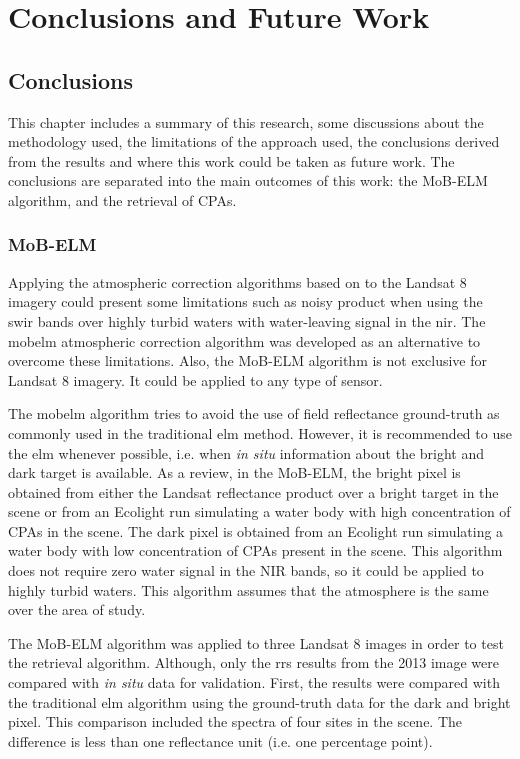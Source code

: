 \chapter{Conclusions and Future Work}
\label{ch:conc_future}
\section{Conclusions}
\label{sec:conc}
This chapter includes a summary of this research, some discussions about the methodology used, the limitations of the approach used, the conclusions derived from the results and where this work could be taken as future work. The conclusions are separated into the main outcomes of this work: the MoB-ELM algorithm, and the retrieval of CPAs.


\subsection{MoB-ELM}
Applying the atmospheric correction algorithms based on \cite{Gordon:1994} to the Landsat 8 imagery could present some limitations such as noisy product when using the \gls{swir} bands over highly turbid waters with water-leaving signal in the \gls{nir}. The \gls{mobelm} atmospheric correction algorithm \cite{Concha2014SPIE} was developed as an alternative to overcome these limitations. Also, the MoB-ELM algorithm is not exclusive for Landsat 8 imagery. It could be applied to any type of sensor.

The \gls{mobelm} algorithm tries to avoid the use of field reflectance ground-truth as commonly used in the traditional \gls{elm} method. However, it is recommended to use the \gls{elm} whenever possible, i.e. when {\it in situ} information about the bright and dark target is available. As a review, in the MoB-ELM, the bright pixel is obtained from either the Landsat reflectance product over a bright target in the scene or from an Ecolight run simulating a water body with high concentration of CPAs in the scene. The dark pixel is obtained from an Ecolight run simulating a water body with low concentration of CPAs present in the scene. This algorithm does not require zero water signal in the NIR bands, so it could be applied to highly turbid waters. This algorithm assumes that the atmosphere is the same over the area of study.

The MoB-ELM algorithm was applied to {three } Landsat 8 images in order to test the retrieval algorithm. Although, only the \gls{rrs} results from the 2013 image were compared with {\it in situ} data for validation. First, the results were compared with the traditional \gls{elm} algorithm using the ground-truth data for the dark and bright pixel. This comparison included the spectra of four sites in the scene. The difference is less than one reflectance unit (i.e. one percentage point). 

